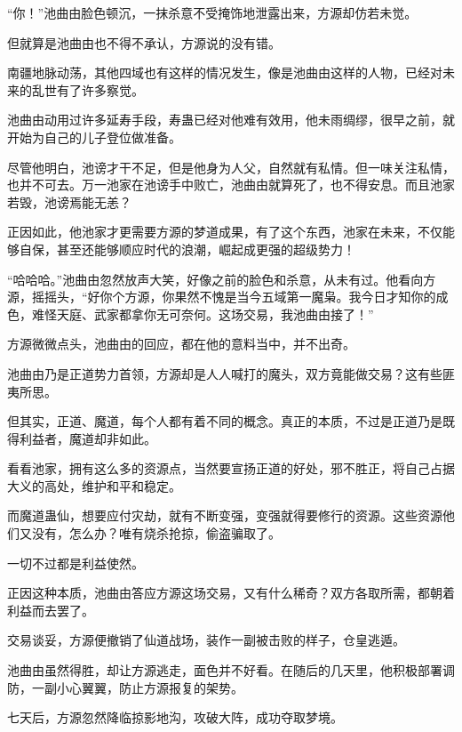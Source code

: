\begin{this_body}
“你！”池曲由脸色顿沉，一抹杀意不受掩饰地泄露出来，方源却仿若未觉。

但就算是池曲由也不得不承认，方源说的没有错。

南疆地脉动荡，其他四域也有这样的情况发生，像是池曲由这样的人物，已经对未来的乱世有了许多察觉。

池曲由动用过许多延寿手段，寿蛊已经对他难有效用，他未雨绸缪，很早之前，就开始为自己的儿子登位做准备。

尽管他明白，池谤才干不足，但是他身为人父，自然就有私情。但一味关注私情，也并不可去。万一池家在池谤手中败亡，池曲由就算死了，也不得安息。而且池家若毁，池谤焉能无恙？

正因如此，他池家才更需要方源的梦道成果，有了这个东西，池家在未来，不仅能够自保，甚至还能够顺应时代的浪潮，崛起成更强的超级势力！

“哈哈哈。”池曲由忽然放声大笑，好像之前的脸色和杀意，从未有过。他看向方源，摇摇头，“好你个方源，你果然不愧是当今五域第一魔枭。我今日才知你的成色，难怪天庭、武家都拿你无可奈何。这场交易，我池曲由接了！”

方源微微点头，池曲由的回应，都在他的意料当中，并不出奇。

池曲由乃是正道势力首领，方源却是人人喊打的魔头，双方竟能做交易？这有些匪夷所思。

但其实，正道、魔道，每个人都有着不同的概念。真正的本质，不过是正道乃是既得利益者，魔道却非如此。

看看池家，拥有这么多的资源点，当然要宣扬正道的好处，邪不胜正，将自己占据大义的高处，维护和平和稳定。

而魔道蛊仙，想要应付灾劫，就有不断变强，变强就得要修行的资源。这些资源他们又没有，怎么办？唯有烧杀抢掠，偷盗骗取了。

一切不过都是利益使然。

正因这种本质，池曲由答应方源这场交易，又有什么稀奇？双方各取所需，都朝着利益而去罢了。

交易谈妥，方源便撤销了仙道战场，装作一副被击败的样子，仓皇逃遁。

池曲由虽然得胜，却让方源逃走，面色并不好看。在随后的几天里，他积极部署调防，一副小心翼翼，防止方源报复的架势。

七天后，方源忽然降临掠影地沟，攻破大阵，成功夺取梦境。

\end{this_body}

